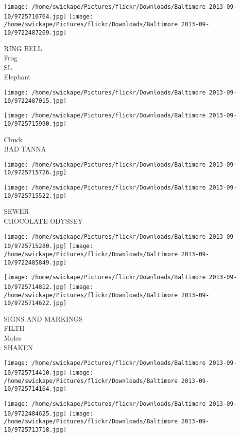 \documentclass[10pt,letterpaper]{article}
\begin{document}
\texttt{[image: /home/swickape/Pictures/flickr/Downloads/Baltimore 2013-09-10/9725716764.jpg]}
\texttt{[image: /home/swickape/Pictures/flickr/Downloads/Baltimore 2013-09-10/9722487269.jpg]}

RING BELL\\
Frog\\
SL\\
Elephant
\pagebreak

\texttt{[image: /home/swickape/Pictures/flickr/Downloads/Baltimore 2013-09-10/9722487015.jpg]}

\vspace{0.25in}
\texttt{[image: /home/swickape/Pictures/flickr/Downloads/Baltimore 2013-09-10/9725715990.jpg]}

Chuck\\
BAD TANNA
\pagebreak

\texttt{[image: /home/swickape/Pictures/flickr/Downloads/Baltimore 2013-09-10/9725715726.jpg]}

\vspace{0.25in}
\texttt{[image: /home/swickape/Pictures/flickr/Downloads/Baltimore 2013-09-10/9725715522.jpg]}

SEWER\\
CHOCOLATE ODYSSEY
\pagebreak

\texttt{[image: /home/swickape/Pictures/flickr/Downloads/Baltimore 2013-09-10/9725715280.jpg]}
\texttt{[image: /home/swickape/Pictures/flickr/Downloads/Baltimore 2013-09-10/9722485849.jpg]}

\texttt{[image: /home/swickape/Pictures/flickr/Downloads/Baltimore 2013-09-10/9725714812.jpg]}
\texttt{[image: /home/swickape/Pictures/flickr/Downloads/Baltimore 2013-09-10/9725714622.jpg]}

SIGNS AND MARKINGS\\
FILTH\\
Moles\\
SHAKEN
\pagebreak

\texttt{[image: /home/swickape/Pictures/flickr/Downloads/Baltimore 2013-09-10/9725714410.jpg]}
\texttt{[image: /home/swickape/Pictures/flickr/Downloads/Baltimore 2013-09-10/9725714164.jpg]}

\texttt{[image: /home/swickape/Pictures/flickr/Downloads/Baltimore 2013-09-10/9722484625.jpg]}
\texttt{[image: /home/swickape/Pictures/flickr/Downloads/Baltimore 2013-09-10/9725713718.jpg]}
\end{document}
